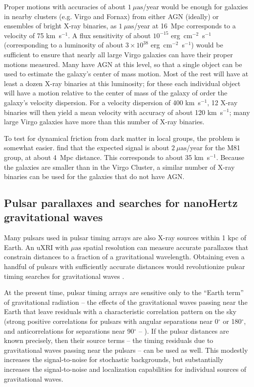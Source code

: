 \documentclass[fleqn,10pt]{SelfArx}
\begin{document}
Proper motions with accuracies of about $1~\mu\text{as}$/year would be enough for galaxies in nearby clusters (e.g. Virgo and Fornax) from either AGN (ideally) or ensembles of bright X-ray binaries, as $1~\mu\text{as}$/year at 16~Mpc corresponds to a velocity of 75 km~s$^{-1}$. A flux sensitivity of about $10^{-15}$ erg~cm$^{-2}$~s$^{-1}$ (corresponding to a luminosity of about $3\times10^{38}$ erg~cm$^{-2}$~s$^{-1}$) would be sufficient to ensure that nearly all large Virgo galaxies can have their proper motions measured. Many have AGN at this level, so that a single object can be used to estimate the galaxy's center of mass motion. Most of the rest will have at least a dozen X-ray binaries at this luminosity; for these each individual object will have a motion relative to the center of mass of the galaxy of order the galaxy's velocity dispersion. For a velocity dispersion of 400 km~s$^{-1}$, 12 X-ray binaries will then yield a mean velocity with accuracy of about 120 km~s$^{-1}$; many large Virgo galaxies have more than this number of X-ray binaries.

To test for dynamical friction from dark matter in local groups, the problem is somewhat easier. \cite{2017MNRAS.467..273O} find that the expected signal is about $2~\mu\text{as}$/year for the M81 group, at about 4~Mpc distance. This corresponds to about 35 km~s$^{-1}$. Because the galaxies are smaller than in the Virgo Cluster, a similar number of X-ray binaries can be used for the galaxies that do not have AGN.

\subsection{Pulsar parallaxes and searches for nanoHertz gravitational waves}

Many pulsars used in pulsar timing arrays \citep{2025Ap&SS.370..124T} are also X-ray sources within 1 kpc of Earth. An uXRI with $\mu\text{as}$ spatial resolution can measure accurate parallaxes that constrain distances to a fraction of a gravitational wavelength. Obtaining even a handful of pulsars with sufficiently accurate distances would revolutionize pulsar timing searches for gravitational waves \citep{2026arXiv260310120T,2026ChPhL..43f1102W}.

At the present time, pulsar timing arrays are sensitive only to the ``Earth term'' of gravitational radiation -- the effects of the gravitational waves passing near the Earth that leave residuals with a characteristic correlation pattern on the sky (strong positive correlations for pulsars with angular separations near 0$^\circ$ or 180$^\circ$, and anticorrelations for separations near 90$^\circ$ -- \citealt{1983ApJ...265L..39H}). If the pulsar distances are known precisely, then their source terms -- the timing residuals due to gravitational waves passing near the pulsars -- can be used as well. This modestly increases the signal-to-noise for stochastic backgrounds, but substantially increases the signal-to-noise and localization capabilities for individual sources of gravitational waves.
\end{document}
